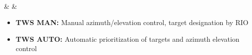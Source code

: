 \documentclass[fontInter]{TechCheck}
\begin{document}
\begin{listlongtable}
\begin{minipage}[t]{\linewidth}
\begin{itemize}
			\end{itemize}
		\end{minipage} \\
		\midrule
		\textbf{\textbullet} &  &
		\begin{minipage}[t]{\linewidth}
			\vspace{-7pt}
			\begin{itemize}
				\item \textbf{TWS MAN:} Manual azimuth/elevation control, target designation by RIO
				\item \textbf{TWS AUTO:} Automatic prioritization of targets and azimuth elevation control
			\end{itemize}
		\end{minipage} \\
	\end{listlongtable}

	\clearpage
\end{document}
